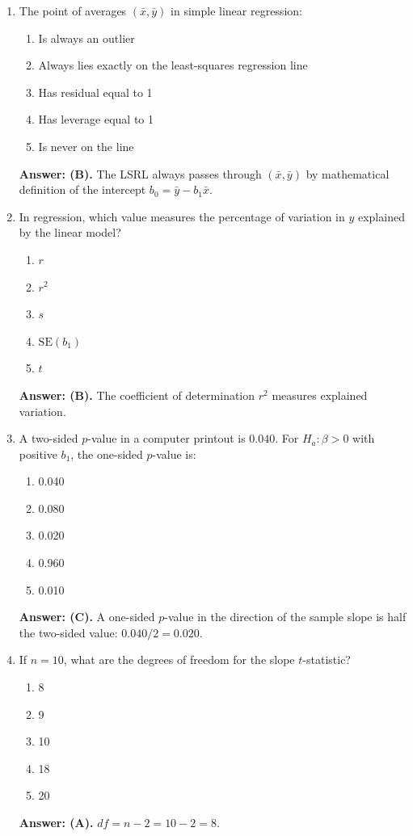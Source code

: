 \begin{enumerate}[leftmargin=1.5em]
  \item The point of averages $(\bar{x}, \bar{y})$ in simple linear regression:
  \begin{enumerate}[label=(\Alph*)]
    \item Is always an outlier \item Always lies exactly on the least-squares regression line \item Has residual equal to 1 \item Has leverage equal to 1 \item Is never on the line
  \end{enumerate}
  \textbf{Answer: (B).} The LSRL always passes through $(\bar{x}, \bar{y})$ by mathematical definition of the intercept $b_0 = \bar{y} - b_1 \bar{x}$.

  \item In regression, which value measures the percentage of variation in $y$ explained by the linear model?
  \begin{enumerate}[label=(\Alph*)]
    \item $r$ \item $r^2$ \item $s$ \item $\text{SE}(b_1)$ \item $t$
  \end{enumerate}
  \textbf{Answer: (B).} The coefficient of determination $r^2$ measures explained variation.

  \item A two-sided $p$-value in a computer printout is $0.040$. For $H_a: \beta > 0$ with positive $b_1$, the one-sided $p$-value is:
  \begin{enumerate}[label=(\Alph*)]
    \item 0.040 \item 0.080 \item 0.020 \item 0.960 \item 0.010
  \end{enumerate}
  \textbf{Answer: (C).} A one-sided $p$-value in the direction of the sample slope is half the two-sided value: $0.040 / 2 = 0.020$.

  \item If $n = 10$, what are the degrees of freedom for the slope $t$-statistic?
  \begin{enumerate}[label=(\Alph*)]
    \item 8 \item 9 \item 10 \item 18 \item 20
  \end{enumerate}
  \textbf{Answer: (A).} $df = n - 2 = 10 - 2 = 8$.


\end{enumerate}
